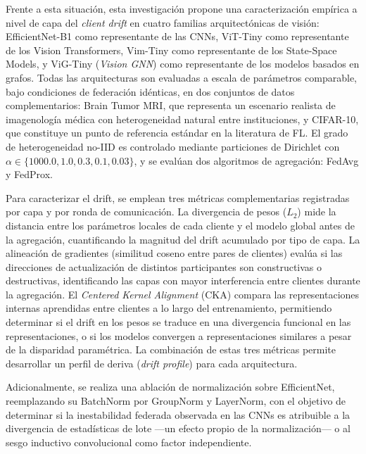 Frente a esta situación, esta investigación propone una caracterización empírica a nivel de capa 
del \textit{client drift} en cuatro familias arquitectónicas de visión: EfficientNet-B1 como 
representante de las CNNs, ViT-Tiny como representante de los Vision Transformers, Vim-Tiny como 
representante de los State-Space Models, y ViG-Tiny (\textit{Vision GNN}) como representante de 
los modelos basados en grafos. Todas las arquitecturas son evaluadas a escala de parámetros 
comparable, bajo condiciones de federación idénticas, en dos conjuntos de datos complementarios: 
Brain Tumor MRI, que representa un escenario realista de imagenología médica con heterogeneidad 
natural entre instituciones, y CIFAR-10, que constituye un punto de referencia estándar en la 
literatura de FL. El grado de heterogeneidad no-IID es controlado mediante particiones de 
Dirichlet con $\alpha \in \{1000.0, 1.0, 0.3, 0.1, 0.03\}$, y se evalúan dos algoritmos de 
agregación: FedAvg y FedProx.


Para caracterizar el drift, se emplean tres métricas complementarias registradas por capa y por 
ronda de comunicación. La divergencia de pesos ($L_2$) mide la distancia entre los parámetros 
locales de cada cliente y el modelo global antes de la agregación, cuantificando la magnitud del 
drift acumulado por tipo de capa. La alineación de gradientes (similitud coseno entre pares de 
clientes) evalúa si las direcciones de actualización de distintos participantes son constructivas 
o destructivas, identificando las capas con mayor interferencia entre clientes durante la 
agregación. El \textit{Centered Kernel Alignment} (CKA) \cite{DBLP:journals/corr/abs-1905-00414} 
compara las representaciones internas aprendidas entre clientes a lo largo del entrenamiento, 
permitiendo determinar si el drift en los pesos se traduce en una divergencia funcional en las 
representaciones, o si los modelos convergen a representaciones similares a pesar de la 
disparidad paramétrica. La combinación de estas tres métricas permite desarrollar un perfil de 
deriva (\textit{drift profile}) para cada arquitectura.


Adicionalmente, se realiza una ablación de normalización sobre EfficientNet, reemplazando su 
BatchNorm por GroupNorm y LayerNorm, con el objetivo de determinar si la inestabilidad federada 
observada en las CNNs es atribuible a la divergencia de estadísticas de lote —un efecto propio 
de la normalización— o al sesgo inductivo convolucional como factor independiente.



